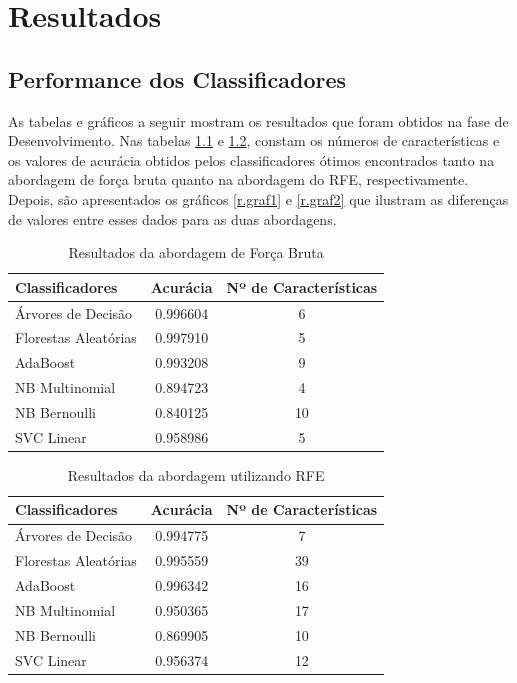 \chapter{Resultados}
\label{c.resultados}

\section{Performance dos Classificadores}

As tabelas e gráficos a seguir mostram os resultados que foram obtidos na fase de Desenvolvimento. Nas tabelas \ref{r.t1} e \ref{r.t2}, constam os números de características e os valores de acurácia obtidos pelos classificadores ótimos encontrados tanto na abordagem de força bruta quanto na abordagem do RFE, respectivamente. Depois, são apresentados os gráficos \ref{r.graf1} e \ref{r.graf2} que ilustram as diferenças de valores entre esses dados para as duas abordagens.



\begin{table}[h!]
  \begin{center}
    \caption{Resultados da abordagem de Força Bruta}
    \label{r.t1}
    \begin{tabular}{l|c|c} %
      \textbf{Classificadores} & \textbf{Acurácia} & \textbf{Nº de Características}\\
      \hline
      Árvores de Decisão & 0.996604 & 6\\
      Florestas Aleatórias & 0.997910 & 5\\
      AdaBoost & 0.993208 & 9\\
      NB Multinomial & 0.894723 & 4\\
      NB Bernoulli & 0.840125 & 10\\
      SVC Linear & 0.958986 & 5\\
    \end{tabular}
  \end{center}
\end{table}

\begin{table}[h!]
  \begin{center}
    \caption{Resultados da abordagem utilizando RFE}
    \label{r.t2}
    \begin{tabular}{l|c|c} %
      \textbf{Classificadores} & \textbf{Acurácia} & \textbf{Nº de Características}\\
      \hline
      Árvores de Decisão & 0.994775 & 7\\
      Florestas Aleatórias & 0.995559 & 39\\
      AdaBoost & 0.996342 & 16\\
      NB Multinomial & 0.950365 & 17\\
      NB Bernoulli & 0.869905 & 10\\
      SVC Linear & 0.956374 & 12\\
    \end{tabular}
  \end{center}
\end{table}


